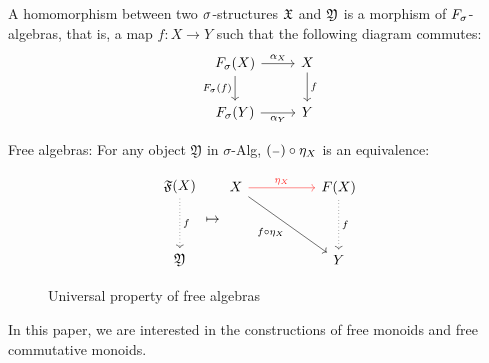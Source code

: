 \begin{definition}[Homomorphism]
    A homomorphism between two $\sigma$-structures $\mathfrak{X}$ and $\mathfrak{Y}$ is a morphism of $\Sig$-algebras,
    that is, a map $f : X \to Y$ such that the following diagram commutes:
    \[
        \begin{tikzcd}
            \Sig(X) \arrow[r, "\alpha_{X}"] \arrow[d, "\Sig(f)"']
            & X \arrow[d, "f"] \\
            \Sig(Y) \arrow[r, "\alpha_{Y}"']
            & Y
        \end{tikzcd}
    \]
\end{definition}

Free algebras: For any object \( \mathfrak{Y} \) in $\sigma$-Alg, $({\scriptstyle{-}}) \circ \eta_X$ is an equivalence:

\begin{figure}[H]
    \centering
    \[\begin{tikzcd}[ampersand replacement=\&]
            \mathfrak{F}(X) \\
            \\
            \mathfrak{Y}
            \arrow["f", dotted, from=1-1, to=3-1]
        \end{tikzcd}
        \mapsto
        \begin{tikzcd}[ampersand replacement=\&]
            X \&\& {F(X)} \\
            \\
            \&\& {Y}
            \arrow["\eta_X", color={rgb,255:red,255;green,54;blue,51}, from=1-1, to=1-3]
            \arrow["f \circ \eta_X"', from=1-1, to=3-3]
            \arrow["{f}", dotted, from=1-3, to=3-3]
        \end{tikzcd}\]
    \caption{Universal property of free algebras}
    \label{fig:universal-property}
\end{figure}



In this paper, we are interested in the constructions of free monoids and free commutative monoids.
